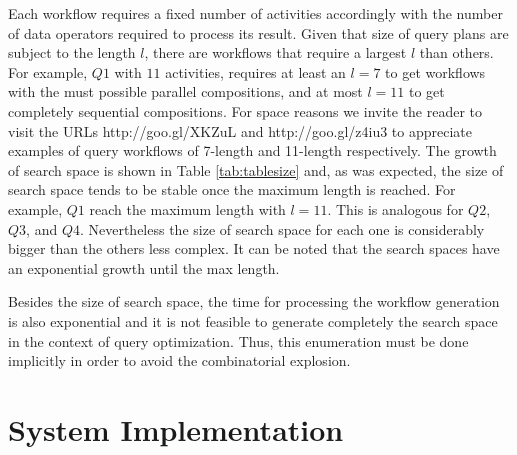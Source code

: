 \documentclass{acm_proc_article-sp}
\begin{document}
Each workflow requires a fixed number of activities accordingly with the number of data operators required to process its result. Given that size of query plans are subject to the length $l$, there are workflows that require a largest $l$ than others.
For example, $Q1$ with $11$ activities, requires at least an $l=7$ to get workflows with the must possible parallel compositions, and at most $l=11$ to get completely sequential compositions. For space reasons we invite the reader to visit the URLs http://goo.gl/XKZuL and http://goo.gl/z4iu3 to appreciate examples of query workflows of 7-length and 11-length respectively.
The growth of search space is shown in Table \ref{tab:tablesize} and, as was expected, the size of search space tends to be stable once the maximum length is reached. For example, $Q1$ reach the maximum length with $l=11$. This is analogous for $Q2$, $Q3$, and $Q4$. Nevertheless the size of search space for each one is considerably bigger than the others less complex. It can be noted that the search spaces have an exponential growth until the max length.
		
%
        
Besides the size of search space, the time for processing the workflow generation is also exponential  and it is not feasible to generate completely the search space in the context of query optimization. Thus, this enumeration must be done implicitly in order to avoid the combinatorial explosion.
		
\section{System Implementation} \label{sec:asasel:demo}
	
\end{document}
